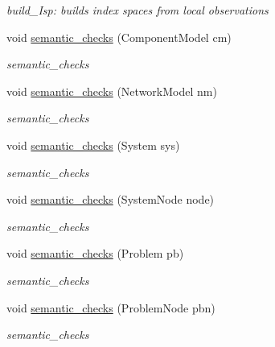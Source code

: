 \begin{DoxyCompactItemize}
\begin{DoxyCompactList}\small\item\em build\+\_\+\+Isp\+: builds index spaces from local observations \end{DoxyCompactList}\item 
void \hyperlink{classspec__driver_a850c8f53f48c51e46fcf8eb08dbca436}{semantic\+\_\+checks} (Component\+Model cm)
\begin{DoxyCompactList}\small\item\em semantic\+\_\+checks \end{DoxyCompactList}\item 
void \hyperlink{classspec__driver_a7e79bc384e1645b85161c7ef1361e1a4}{semantic\+\_\+checks} (Network\+Model nm)
\begin{DoxyCompactList}\small\item\em semantic\+\_\+checks \end{DoxyCompactList}\item 
void \hyperlink{classspec__driver_a9f8fb73fdce4b11df8c6ecf03ba8e3be}{semantic\+\_\+checks} (System sys)
\begin{DoxyCompactList}\small\item\em semantic\+\_\+checks \end{DoxyCompactList}\item 
void \hyperlink{classspec__driver_a043c3c288ade5e461a4e84577f7f18d8}{semantic\+\_\+checks} (System\+Node node)
\begin{DoxyCompactList}\small\item\em semantic\+\_\+checks \end{DoxyCompactList}\item 
void \hyperlink{classspec__driver_a2ca24547de7b6c5424c1d448a6692bb3}{semantic\+\_\+checks} (Problem pb)
\begin{DoxyCompactList}\small\item\em semantic\+\_\+checks \end{DoxyCompactList}\item 
void \hyperlink{classspec__driver_a741561fb61e30a71c24d5f926eee9447}{semantic\+\_\+checks} (Problem\+Node pbn)
\begin{DoxyCompactList}\small\item\em semantic\+\_\+checks \end{DoxyCompactList}\end{DoxyCompactItemize}
